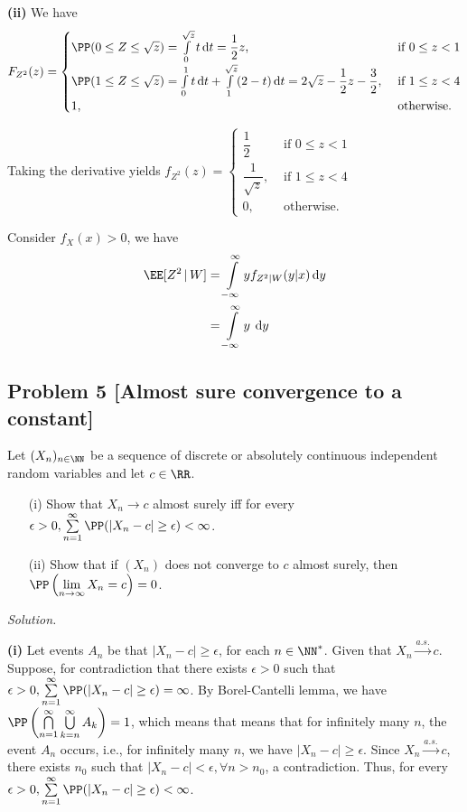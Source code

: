 \textbf{(ii)} We have
$$F_{Z^2}(z)=\begin{cases}
    \PP(0\le Z\le\sqrt{z}) = \int\limits_{0}^{\sqrt{z}}t\,\mathrm{d}t = \dfrac{1}{2}z, &\text{ if } 0\le z <1\\
    \PP(1\le Z\le\sqrt{z}) = \int\limits_{0}^{1}t\,\mathrm{d}t + \int\limits_{1}^{\sqrt{z}}(2-t)\,\mathrm{d}t = 2\sqrt{z}-\dfrac{1}{2}z-\dfrac{3}{2} , &\text{ if } 1\le z <4\\
    1, &\text{ otherwise.}
\end{cases}$$

Taking the derivative yields $f_{Z^2}(z)=\begin{cases}
    \dfrac{1}{2} &\text{ if } 0\le z <1\\
    \dfrac{1}{\sqrt{z}} , &\text{ if } 1\le z <4\\
    0, &\text{ otherwise.}
\end{cases}$


Consider $f_X(x)>0$, we have
\begin{align*}
    \EE[Z^2\,|\,W] 
    &= \int\limits_{-\infty}^{\infty} yf_{Z^2|W}(y|x)\,\mathrm{d}y\\
    &= \int\limits_{-\infty}^{\infty} y\dfrac{}{}\,\mathrm{d}y
\end{align*}

\subsection*{Problem 5 [Almost sure convergence to a constant]} Let $(X_n)_{n\in\NN}$ be a sequence of discrete or absolutely continuous independent random variables and let $c\in\RR$.
\begin{enumerate}
    \item [(i)] Show that $X_n \to c$ almost surely iff for every $\epsilon > 0,\sum\limits_{n=1}^{\infty}\PP(|X_n-c|\ge\epsilon)<\infty$.
    \item [(ii)] Show that if $(X_n)$ does not converge to $c$ almost surely, then $\PP\left(\lim\limits_{n\to\infty} X_n = c\right) = 0$.
\end{enumerate}

\textit{Solution.}

\textbf{(i)} Let events $A_n$ be that $|X_n-c|\ge\epsilon$, for each $n\in\NN^*$. Given that $X_n \xrightarrow{a.s.} c$. Suppose, for contradiction that there exists $\epsilon>0$ such that $\epsilon > 0,\sum\limits_{n=1}^{\infty}\PP(|X_n-c|\ge\epsilon)=\infty$. By Borel-Cantelli lemma, we have $\PP\left(\bigcap\limits_{n=1}^{\infty}\bigcup\limits_{k=n}^{\infty}A_k\right) = 1$, which means that means that for infinitely many $n$, the event $A_n$ occurs, i.e., for infinitely many $n$, we have $|X_n-c|\geq\epsilon$. Since $X_n \xrightarrow{a.s.} c$, there exists $n_0$ such that $|X_n - c| < \epsilon, \forall n > n_0$, a contradiction. Thus, for every $\epsilon > 0,\sum\limits_{n=1}^{\infty}\PP(|X_n-c|\ge\epsilon)<\infty$.

